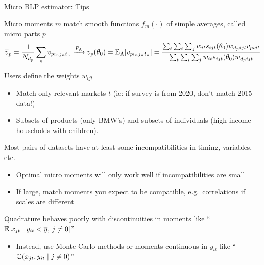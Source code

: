 \begin{frame}[label=estimator]{Micro BLP estimator: Tips}
    \begin{wideitemize}
        \item Micro moments $m$ match smooth functions $f_m(\cdot)$ of simple averages, called micro parts $p$
        \begin{equation*}
            \overline{v}_p = \frac{1}{N_{d_p}} \sum_n v_{pi_nj_nt_n} \xrightarrow{P_\mathrm{A}} v_p(\theta_0) = \mathbb{E}_\mathrm{A}[v_{pi_nj_nt_n}] = \frac{\sum_t \sum_i \sum_j w_{it} s_{ijt}(\theta_0) w_{d_pijt} v_{pijt}}{\sum_t \sum_i \sum_j w_{it} s_{ijt}(\theta_0) w_{d_pijt}}
        \end{equation*}
        \item Users define the \alert{weights} $w_{ijt}$
        \begin{itemize}
            \item Match only relevant markets $t$ (ie: if survey is from 2020, don't match 2015 data!)
            \item Subsets of products (only BMW's) and subsets of individuals (high income households with children).
        \end{itemize}
        
        \item Most pairs of datasets have at least some  \alert{incompatibilities} in timing, variables, etc.
        \begin{itemize}
            \item Optimal micro moments will only work well if incompatibilities are small
            \item If large, match moments you expect to be compatible, e.g.\ correlations if scales are different
        \end{itemize}
    
        \item Quadrature behaves poorly with \alert{discontinuities} in moments like ``$\mathbb{E}[x_{jt} \mid y_{it} < \overline{y}, \, j \neq 0]$''
        \begin{itemize}
            \item Instead, use Monte Carlo methods or moments continuous in $y_{it}$ like ``$\mathbb{C}(x_{jt}, y_{it} \mid j \neq 0)$''
        \end{itemize}
    \end{wideitemize}
\end{frame}




